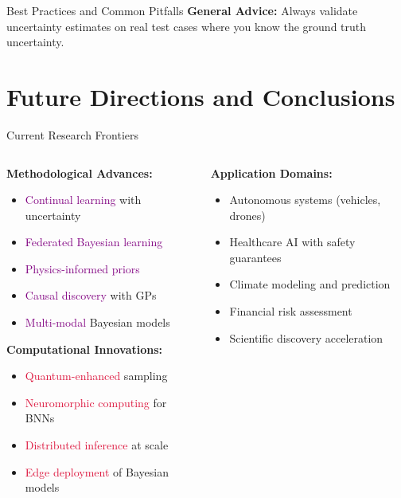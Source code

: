 \documentclass[aspectratio=169,11pt]{beamer}
\begin{document}
\begin{frame}{Best Practices and Common Pitfalls}
\vspace{0.3cm}
\textbf{General Advice:} Always validate uncertainty estimates on real test cases where you know the ground truth uncertainty.
\end{frame}

\section{Future Directions and Conclusions}

\begin{frame}{Current Research Frontiers}
\begin{columns}
\begin{column}{0.5\textwidth}
\textbf{Methodological Advances:}
\begin{itemize}
\item \textcolor{purple}{Continual learning} with uncertainty
\item \textcolor{purple}{Federated Bayesian learning}
\item \textcolor{purple}{Physics-informed priors}
\item \textcolor{purple}{Causal discovery} with GPs
\item \textcolor{purple}{Multi-modal} Bayesian models
\end{itemize}

\vspace{0.3cm}
\textbf{Computational Innovations:}
\begin{itemize}
\item \textcolor{crimson}{Quantum-enhanced} sampling
\item \textcolor{crimson}{Neuromorphic computing} for BNNs
\item \textcolor{crimson}{Distributed inference} at scale
\item \textcolor{crimson}{Edge deployment} of Bayesian models
\end{itemize}
\end{column}
\begin{column}{0.5\textwidth}
\textbf{Application Domains:}
\begin{itemize}
\item \textcolor{forest}{Autonomous systems} (vehicles, drones)
\item \textcolor{forest}{Healthcare AI} with safety guarantees
\item \textcolor{forest}{Climate modeling} and prediction
\item \textcolor{forest}{Financial risk} assessment
\item \textcolor{forest}{Scientific discovery} acceleration
\end{itemize}


\end{column}
\end{columns}
\end{frame}
\end{document}
